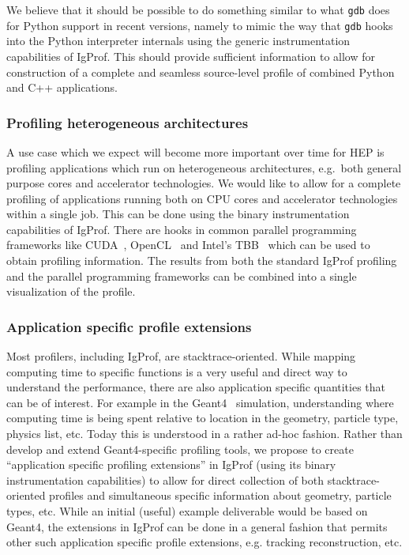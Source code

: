 \documentclass[notitlepage,letter,12pt]{article}
\begin{document}
We believe that it should be possible to do something similar to what 
\texttt{gdb} does for Python support in recent versions, namely to mimic the
way that \texttt{gdb} hooks into the Python interpreter internals using the 
generic instrumentation capabilities of IgProf. This should provide
sufficient information to allow for construction of a complete and
seamless source-level profile of combined Python and C++ applications.

\subsubsection{Profiling heterogeneous architectures}

A use case which we expect will become more important over time for
HEP is profiling applications which run on heterogeneous architectures,
e.g.\ both general purpose cores and accelerator technologies.
We would like to allow for a complete profiling of applications running both 
on CPU cores and accelerator 
technologies within a single job.  This can be done using the binary
instrumentation capabilities of IgProf. There are hooks in common
parallel programming frameworks like CUDA~\cite{PROFCUDA},
OpenCL~\cite{PROFOPENCL} and Intel's TBB~\cite{PROFTBB} which can be used
to obtain profiling information. The results from both the standard
IgProf profiling and the parallel programming frameworks can be combined 
into a single visualization of the profile.

\subsubsection{Application specific profile extensions}

Most profilers, including IgProf, are stacktrace-oriented. While mapping
computing time to specific functions is a very useful and direct way
to understand the performance, there are also application specific
quantities that can be of interest. For example in the Geant4~\cite{GEANT4} 
simulation,
understanding where computing time is being spent relative to location
in the geometry, particle type, physics list, etc. Today this is
understood in a rather ad-hoc fashion. Rather than develop and extend
Geant4-specific profiling tools, we propose to create ``application
specific profiling extensions'' in IgProf (using its binary
instrumentation capabilities) to allow for direct collection of both
stacktrace-oriented profiles and simultaneous specific information
about geometry, particle types, etc. 
While an initial (useful) example deliverable would be based on Geant4, the 
extensions in IgProf can be done in a general fashion that permits other such 
application specific profile extensions, e.g. tracking reconstruction, etc.
\end{document}

